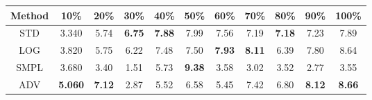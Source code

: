 \documentclass{standalone}
\begin{document}
\begin{tabular}{c|cccccccccc}
      \toprule
      Method & 10\% & 20\% & 30\% & 40\% & 50\% & 60\% & 70\% & 80\% & 90\% & 100\% \\
      \midrule
STD & 3.340 & 5.74 & \textbf{6.75} & \textbf{7.88} & 7.99 & 7.56 & 7.19 & \textbf{7.18} & 7.23 & 7.89\\
LOG & 3.820 & 5.75 & 6.22 & 7.48 & 7.50 & \textbf{7.93} & \textbf{8.11} & 6.39 & 7.80 & 8.64\\
SMPL & 3.680 & 3.40 & 1.51 & 5.73 & \textbf{9.38} & 3.58 & 3.02 & 3.52 & 2.77 & 3.55\\
ADV & \textbf{5.060} & \textbf{7.12} & 2.87 & 5.52 & 6.58 & 5.45 & 7.42 & 6.80 & \textbf{8.12} & \textbf{8.66}\\
  \bottomrule
\end{tabular}
\end{document}
